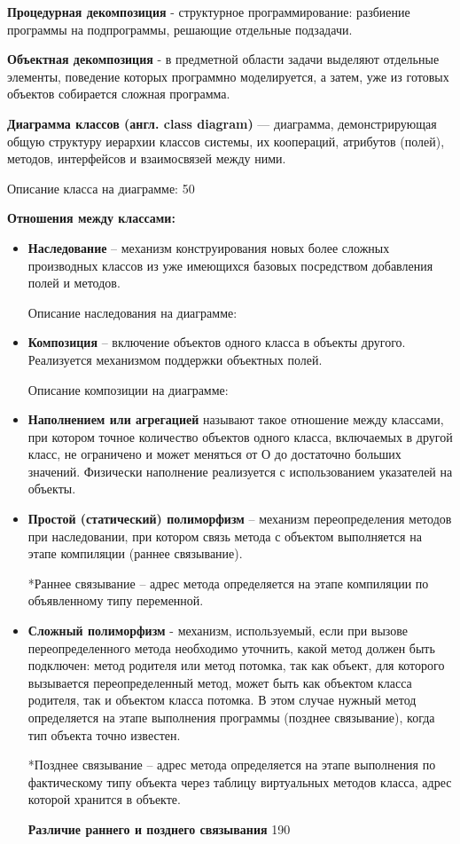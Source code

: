 {\bf {Процедурная декомпозиция}} - структурное программирование: разбиение программы на подпрограммы, решающие отдельные подзадачи.

{\bf {Объектная декомпозиция}} - в предметной области задачи выделяют отдельные элементы, поведение которых программно моделируется, а затем, уже из готовых объектов собирается сложная программа.

{\bf {Диаграмма классов (англ. class diagram)}} — диаграмма, демонстрирующая общую структуру иерархии классов системы, их коопераций, атрибутов (полей), методов, интерфейсов и взаимосвязей между ними.

Описание класса на диаграмме:
 {50}

{\bf{Отношения между классами:}}
\begin{itemize}
\item{\bf {Наследование}} – механизм конструирования новых более сложных производных классов из уже имеющихся базовых посредством добавления полей и методов. 

Описание наследования на диаграмме:

\item{\bf {Композиция}} – включение объектов одного класса в объекты другого. Реализуется механизмом поддержки объектных полей.

Описание композиции на диаграмме:

\item{\bf {Наполнением или агрегацией}} называют такое отношение между классами, при котором точное количество объектов одного класса, включаемых в 
другой класс, не ограничено и может меняться от О до достаточно больших 
значений. Физически наполнение реализуется с использованием указателей 
на объекты.



\item{\bf{Простой (статический) полиморфизм}} – механизм переопределения методов при наследовании, при котором связь метода с объектом выполняется на этапе компиляции (раннее связывание).

*Раннее связывание – адрес метода определяется на этапе компиляции по объявленному типу переменной.

\item {\bf{Сложный полиморфизм}} - механизм, используемый, если при вызове переопределенного метода необходимо уточнить, какой метод должен быть подключен: метод 
родителя или метод потомка, так как объект, для которого вызывается переопределенный метод, может быть как объектом класса родителя, так и объектом класса потомка. В этом случае нужный метод определяется на этапе выполнения программы (позднее связывание), когда тип объекта точно известен.

*Позднее связывание – адрес метода определяется на этапе выполнения по фактическому типу объекта через таблицу виртуальных методов класса, адрес которой хранится в объекте.

{\bf{Различие раннего и позднего связывания}}
 {190} 
\end{itemize}

